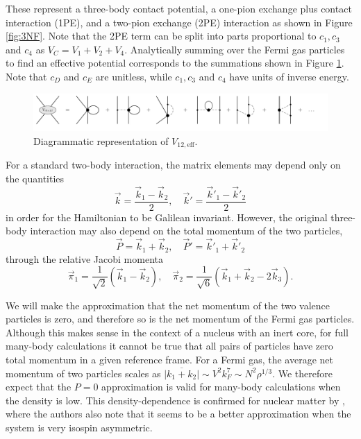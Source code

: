 \documentclass[%
 preprint,
 amsmath,amssymb,
 aps,
]{revtex4-1}
\begin{document}
These represent a three-body contact potential, a one-pion exchange plus contact interaction (1PE), and a two-pion exchange (2PE) interaction as shown in Figure \ref{fig:3NF}. Note that the 2PE term can be split into parts proportional to $c_1, c_3$ and $c_4$ as $V_C=V_1+V_2+V_4$. Analytically summing over the Fermi gas particles to find an effective potential corresponds to the summations shown in Figure \ref{fig:eff-diagram}. Note that $c_D$ and $c_E$ are unitless, while $c_1, c_3$ and $c_4$ have units of inverse energy. 

\begin{figure}
\includegraphics[scale=0.6,page=1]{Figures/InMediumDiagrams2}
\caption{\label{fig:eff-diagram} Diagrammatic representation of $V_{12,\text{eff}}$.}
\end{figure}

For a standard two-body interaction, the matrix elements may depend only on the quantities
 \begin{equation}
 \vec{k}=\frac{\vec{k}_1-\vec{k}_2}{2},\quad \vec{k}'=\frac{\vec{k}'_1-\vec{k}'_2}{2}
 \end{equation}
 in order for the Hamiltonian to be Galilean invariant. However, the original three-body interaction may also depend on the total momentum of the two particles,
 \begin{equation}
 \vec{P}=\vec{k}_1+\vec{k}_2, \quad  \vec{P}'=\vec{k}'_1+\vec{k}'_2
 \end{equation}
 through the relative Jacobi momenta 
 \begin{equation}
 \vec{\pi}_1=\frac{1}{\sqrt{2}}\left(\vec{k}_1-\vec{k}_2\right), \quad  \vec{\pi}_2=\frac{1}{\sqrt{6}}\left(\vec{k}_1+\vec{k}_2-2\vec{k}_3\right).
 \end{equation}
 
We will make the approximation that the net momentum of the two valence particles is zero, and therefore so is the net momentum of the Fermi gas particles. Although this makes sense in the context of a nucleus with an inert core, for full many-body calculations it cannot be true that all pairs of particles have zero total momentum in a given reference frame. For a Fermi gas, the average net momentum of two particles scales as 
$\overline{|k_1+k_2|} \sim V^2 k_F^7 
\sim N^2 \rho^{1/3}$. 
We therefore expect that the $P=0$ approximation is valid for many-body calculations when the density is low. This density-dependence is confirmed for nuclear matter by \cite{Drischler:2015eba}, where the authors also note that it seems to be a better approximation when the system is very isospin asymmetric. 
 
\end{document}

